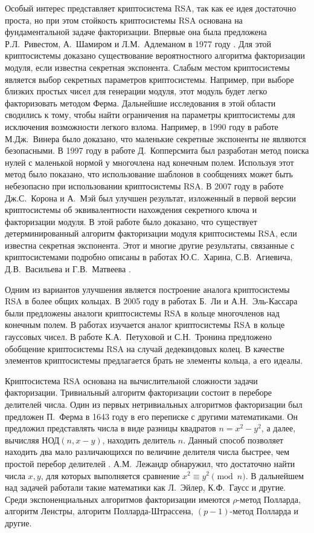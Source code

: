 \documentclass[_00_dissertation.tex]{subfiles}
\begin{document}
Особый интерес представляет криптосистема RSA, так как ее идея достаточно проста, но при этом стойкость криптосистемы RSA основана на фундаментальной задаче факторизации.
Впервые она была предложена Р.Л.~Ривестом, А.~Шамиром и Л.М.~Адлеманом в 1977 году \cite{source:Rivest}.
Для этой криптосистемы доказано существование вероятностного алгоритма факторизации модуля, если известна секретная экспонента.
Слабым местом криптосистемы является выбор секретных параметров криптосистемы.
Например, при выборе близких простых чисел для генерации модуля, этот модуль будет легко факторизовать методом Ферма.
Дальнейшие исследования в этой области сводились к тому, чтобы найти ограничения на параметры криптосистемы для исключения возможности легкого взлома.
Например, в 1990 году в работе М.Дж.~Винера \cite{source:Wiener} было доказано, что маленькие секретные экспоненты не являются безопасными.
В 1997 году в работе Д.~Копперсмита \cite{source:Coppersmith} был разработан метод поиска нулей с маленькой нормой у многочлена над конечным полем.
Используя этот метод было показано, что использование шаблонов в сообщениях может быть небезопасно при использовании криптосистемы RSA.
В 2007 году в работе Дж.С.~Корона и А.~Мэй \cite{source:Coron} был улучшен результат, изложенный в первой версии криптосистемы об эквивалентности нахождения секретного ключа и факторизации модуля.
В этой работе было доказано, что существует детерминированный алгоритм факторизации модуля криптосистемы RSA, если известна секретная экспонента.
Этот и многие другие результаты, связанные с криптосистемами подробно описаны в работах Ю.С.~Харина, С.В.~Агиевича, Д.В.~Васильева и Г.В.~Матвеева \cite{source:Matveev_2019, source:Matveev_2018, source:Kharin}.

Одним из вариантов улучшения является построение аналога криптосистемы RSA в более общих кольцах.
В 2005 году в работах Б.~Ли и А.Н.~Эль-Кассара \cite{source:El_Kassar, source:Li} были предложены аналоги криптосистемы RSA в кольце многочленов над конечным полем.
В работах \cite{source:El_Kassar, source:Elkamchouchi, source:Koval} изучается аналог криптосистемы RSA в кольце гауссовых чисел.
В работе К.А.~Петуховой и С.Н.~Тронина \cite{source:Petukhova} предложено обобщение криптосистемы RSA на случай дедекиндовых колец.
В качестве элементов криптосистемы предлагается брать не элементы кольца, а его идеалы.

Криптосистема RSA основана на вычислительной сложности задачи факторизации.
Тривиальный алгоритм факторизации состоит в переборе делителей числа.
Один из первых нетривиальных алгоритмов факторизации был предложен П.~Ферма в 1643 году в его переписке с другими математиками.
Он предложил представлять числа в виде разницы квадратов $n = x^2 - y^2$, а далее, вычисляя $\textrm{НОД}(n,x-y)$, находить делитель $n$.
Данный способ позволяет находить два мало различающихся по величине делителя числа быстрее, чем простой перебор делителей \cite{source:Yaschenko}.
А.М.~Лежандр обнаружил, что достаточно найти числа $x, y$, для которых выполняется сравнение $x^{2}\equiv y^{2}\pmod{n}$.
В дальнейшем над задачей работали такие математики как Л.~Эйлер, К.Ф.~Гаусс и другие.
Среди экспоненциальных алгоритмов факторизации имеются $\rho$-метод Полларда, алгоритм Ленстры, алгоритм Полларда-Штрассена, $(p-1)$-метод Полларда и другие.
\end{document}
